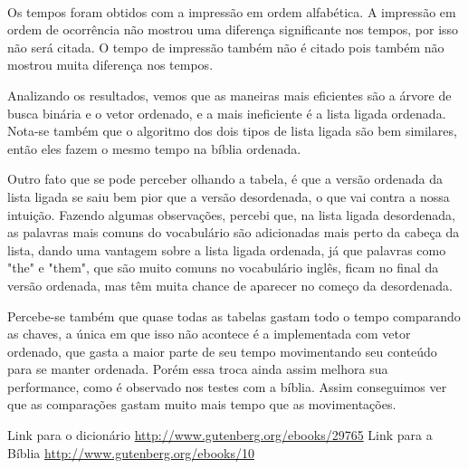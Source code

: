 \documentclass[12pt, a4paper]{article} %
\begin{document}
\hfill \\
\hfill
\par Os tempos foram obtidos com a impressão em ordem alfabética. A impressão em ordem de ocorrência não mostrou uma diferença significante nos tempos, por isso não será citada. O tempo de impressão também não é citado pois também não mostrou muita diferença nos tempos.
\par Analizando os resultados, vemos que as maneiras mais eficientes são a árvore de busca binária e o vetor ordenado, e a mais ineficiente é a lista ligada ordenada. Nota-se também que o algoritmo dos dois tipos de lista ligada são bem similares, então eles fazem o mesmo tempo na bíblia ordenada.
\par Outro fato que se pode perceber olhando a tabela, é que a versão ordenada da lista ligada se saiu bem pior que a versão desordenada, o que vai contra a nossa intuição. Fazendo algumas observações, percebi que, na lista ligada desordenada, as palavras mais comuns do vocabulário são adicionadas mais perto da cabeça da lista, dando uma vantagem sobre a lista ligada ordenada, já que palavras como "the" e "them", que são muito comuns no vocabulário inglês, ficam no final da versão ordenada, mas têm muita chance de aparecer no começo da desordenada.
\par Percebe-se também que quase todas as tabelas gastam todo o tempo comparando as chaves, a única em que isso não acontece é a implementada com vetor ordenado, que gasta a maior parte de seu tempo movimentando seu conteúdo para se manter ordenada. Porém essa troca ainda assim melhora sua performance, como é observado nos testes com a bíblia. Assim conseguimos ver que as comparações gastam muito mais tempo que as movimentações.
\begin{thebibliography}{2}
 Link para o dicionário \url{http://www.gutenberg.org/ebooks/29765}
 Link para a Bíblia \url{http://www.gutenberg.org/ebooks/10}
\end{thebibliography}
\end{document}
